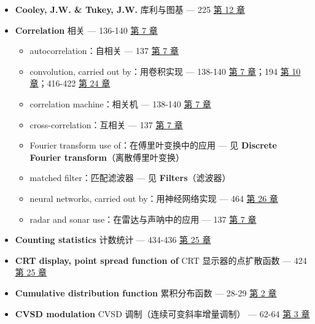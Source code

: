 \begin{itemize}
\begin{itemize}
    neural networks, carried out by：用神经网络实现 --- 464-465
     \hyperref[ch-26]{第 26 章}
  \item
    output side view：输出端视角 --- 116-121 
    \hyperref[ch-06]{第 6 章}；246-247  \hyperref[ch-13]{第 13
    章}；399-400, 418-421  \hyperref[ch-24]{第 24 章}
  \item
    piecewise polynomial method：分段多项式法 --- 250-252 
    \hyperref[ch-13]{第 13 章}
  \item
    separability, image convolution by：可分离性，用于图像卷积 ---
    404-407  \hyperref[ch-24]{第 24 章}
  \item
    sum of weighted inputs, viewed as：看作输入的加权和 --- 122
     \hyperref[ch-06]{第 6 章}
  \end{itemize}
\item
  \textbf{Cooley, J.W. \& Tukey, J.W.} 库利与图基 --- 225 
  \hyperref[ch-12]{第 12 章}
\item
  \textbf{Correlation} 相关 --- 136-140  \hyperref[ch-07]{第 7
  章}

  \begin{itemize}
  \tightlist
  \item
    autocorrelation：自相关 --- 137  \hyperref[ch-07]{第 7 章}
  \item
    convolution, carried out by：用卷积实现 --- 138-140 
    \hyperref[ch-07]{第 7 章}；194  \hyperref[ch-10]{第 10
    章}；416-422  \hyperref[ch-24]{第 24 章}
  \item
    correlation machine：相关机 --- 138-140 
    \hyperref[ch-07]{第 7 章}
  \item
    cross-correlation：互相关 --- 137  \hyperref[ch-07]{第 7
    章}
  \item
    Fourier transform use of：在傅里叶变换中的应用 --- 见
    \textbf{Discrete Fourier transform}（离散傅里叶变换）
  \item
    matched filter：匹配滤波器 --- 见 \textbf{Filters}（滤波器）
  \item
    neural networks, carried out by：用神经网络实现 --- 464 
    \hyperref[ch-26]{第 26 章}
  \item
    radar and sonar use：在雷达与声呐中的应用 --- 137 
    \hyperref[ch-07]{第 7 章}
  \end{itemize}
\item
  \textbf{Counting statistics} 计数统计 --- 434-436 
  \hyperref[ch-25]{第 25 章}
\item
  \textbf{CRT display, point spread function of} CRT 显示器的点扩散函数
  --- 424  \hyperref[ch-25]{第 25 章}
\item
  \textbf{Cumulative distribution function} 累积分布函数 --- 28-29
   \hyperref[ch-02]{第 2 章}
\item
  \textbf{CVSD modulation} CVSD 调制（连续可变斜率增量调制） --- 62-64
   \hyperref[ch-03]{第 3 章}
\end{itemize}

